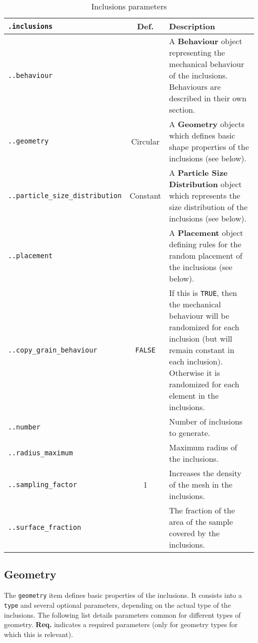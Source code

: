 \documentclass[10pt]{article}
\begin{document}
\begin{table}[h!]
\begin{tabularx}{\textwidth}{lcX}
\verb+.inclusions+ &  Def. & Description \\
\hline
\verb+..behaviour+ & & A \textbf{Behaviour} object representing the mechanical behaviour of the inclusions. Behaviours are described in their own section. \\
\verb+..geometry+ & Circular & A \textbf{Geometry} objects which defines basic shape properties of the inclusions (see below).\\
\verb+..particle_size_distribution+ & Constant & A \textbf{Particle Size Distribution} object which represents the size distribution of the inclusions (see below).\\
\verb+..placement+ & & A \textbf{Placement} object defining rules for the random placement of the inclusions (see below). \\	
\verb+..copy_grain_behaviour+ & \verb+FALSE+ & If this is \verb+TRUE+, then the mechanical behaviour will be randomized for each inclusion (but will remain constant in each inclusion). Otherwise it is randomized for each element in the inclusions.\\
\verb+..number+ &  & Number of inclusions to generate.\\
\verb+..radius_maximum+ &  & Maximum radius of the inclusions.\\
\verb+..sampling_factor+ & 1 & Increases the density of the mesh in the inclusions.\\
\verb+..surface_fraction+ &  & The fraction of the area of the sample covered by the inclusions.\\
\hline
\end{tabularx}
\caption{Inclusions parameters}
\end{table}

\subsection{Geometry}

The \verb+geometry+ item defines basic properties of the inclusions.
It consists into a \verb+type+ and several optional parameters, depending on the actual type of the inclusions.
The following list details parameters common for different types of geometry.
\textbf{Req.} indicates a required parameters (only for geometry types for which this is relevant).

\eject 
\end{document}
